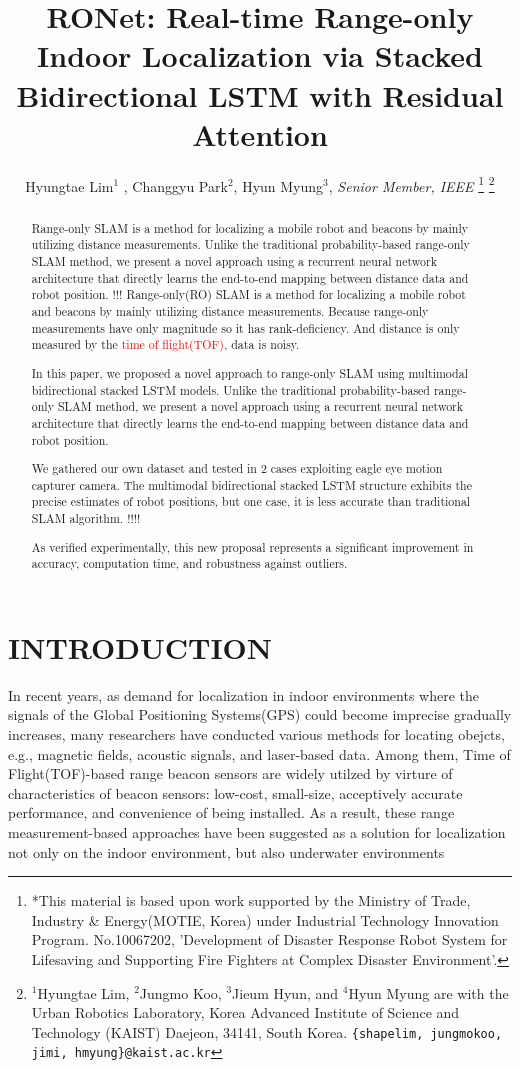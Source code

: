 \documentclass[letterpaper, 10 pt, conference]{ieeeconf}  %
\title{\LARGE \bf
RONet: Real-time Range-only Indoor Localization via Stacked Bidirectional LSTM with Residual Attention}
\author{Hyungtae Lim$^{1}$ , Changgyu Park$^{2}$, Hyun Myung$^{3}$, \textit{Senior Member, IEEE}%
\thanks{
	*This material is based upon work supported by the Ministry of Trade, Industry \& Energy(MOTIE, Korea) under Industrial Technology Innovation Program. No.10067202, 'Development of Disaster Response Robot System for Lifesaving and Supporting Fire Fighters at Complex Disaster Environment'.}%
\thanks{$^{1}$Hyungtae Lim, $^{2}$Jungmo Koo, $^{3}$Jieum Hyun, and $^{4}$Hyun Myung are with
	the Urban Robotics Laboratory, Korea Advanced Institute of Science
	and Technology (KAIST) Daejeon, 34141, South Korea. {\tt\small \{shapelim, jungmokoo, jimi, hmyung\}@kaist.ac.kr}}%
%
}
\begin{document}


\maketitle
\thispagestyle{empty}
\pagestyle{empty}


\begin{abstract}



Range-only SLAM is a method for localizing a mobile robot and beacons by mainly utilizing distance measurements. Unlike the traditional probability-based range-only SLAM method, we present a novel approach using a recurrent neural network architecture that directly learns the end-to-end mapping between distance data and robot position.
!!!
Range-only(RO) SLAM is a method for localizing a mobile robot and beacons by mainly utilizing distance measurements. Because range-only measurements have only magnitude so it has rank-deficiency. And distance is only measured by the \textcolor{red}{time of flight(TOF)}, data is noisy.

In this paper, we proposed a novel approach to range-only SLAM using multimodal bidirectional stacked LSTM models. Unlike the traditional probability-based range-only SLAM method, we present a novel approach using a recurrent neural network architecture that directly learns the end-to-end mapping between distance data and robot position.

We gathered our own dataset and tested in 2 cases exploiting eagle eye motion capturer camera. The multimodal bidirectional stacked LSTM structure exhibits the precise estimates of robot positions, but one case, it is less accurate than traditional SLAM algorithm. 
!!!!

As verified experimentally, this new proposal represents a significant improvement in accuracy, computation time, and robustness against outliers.

\end{abstract}


\section{INTRODUCTION}

In recent years, as demand for localization in indoor environments where the signals of the Global Positioning Systems(GPS) could become imprecise gradually increases, many researchers have conducted various methods for locating obejcts, e.g., magnetic fields, acoustic signals, and laser-based data. Among them, Time of Flight(TOF)-based range beacon sensors are widely utilzed by virture of characteristics of beacon sensors: low-cost, small-size, acceptively accurate performance, and convenience of being installed. As a result, these range measurement-based approaches have been suggested as a solution for localization  not only on the indoor environment\cite{peneda2009trilateration, jung2011indoor}, but also underwater environments\cite{newman2003pure, olson2006robust}
 
\end{document}
